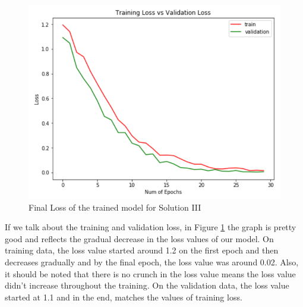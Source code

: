 \begin{figure}[H]
\centering
\includegraphics[scale=0.8]{images/Chapter5/sol_3/loss3_sol3.png}
\caption{Final Loss of the trained model for Solution III}
\label{loss_sol3}
\end{figure}
\par
If we talk about the training and validation loss, in Figure \ref{loss_sol3} the graph is pretty good and reflects the gradual decrease in the loss values of our model. On training data, the loss value started around 1.2 on the first epoch and then decreases gradually and by the final epoch, the loss value was around 0.02. Also, it should be noted that there is no crunch in the loss value means the loss value didn't increase throughout the training. On the validation data, the loss value started at 1.1 and in the end, matches the values of training loss.
